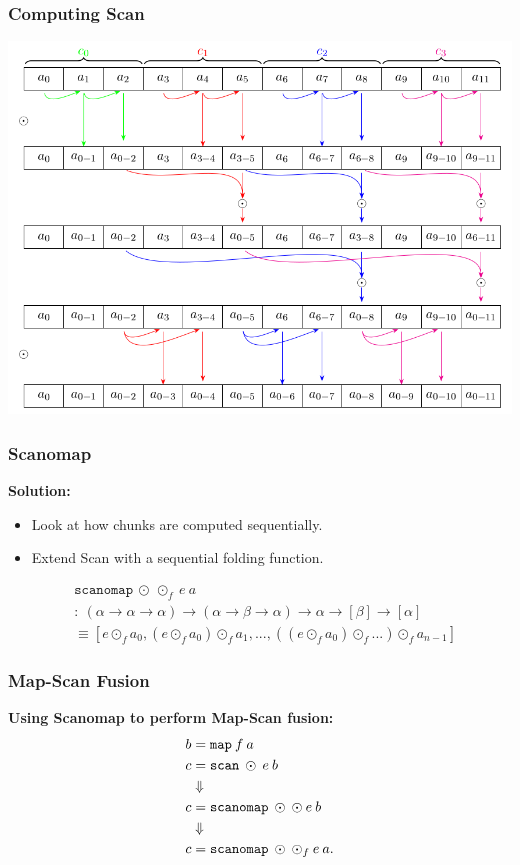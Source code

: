 \documentclass{beamer}
\begin{document}
\begin{frame}

 \frametitle{Computing Scan}
 \includegraphics[height=0.7\textheight]{image/monster.png}
\end{frame}


\begin{frame}

 \frametitle{Scanomap}
\large \textbf{Solution:}
 \begin{itemize}
 \item Look at how chunks are computed sequentially.
 \item Extend Scan with a sequential folding function.
 \end{itemize}
 \begin{align*}
   &\mathtt{scanomap} \: \odot \: \odot_f \: e \: a \: \\ &: \:(\alpha \to \alpha \to \alpha) \to (\alpha \to \beta \to \alpha)
 \to \alpha \to [\beta] \to [\alpha] \\
&\equiv
 [e \odot_f a_0, (e \odot_f a_0) \odot_f a_1, ..., ((e \odot_f a_0) \odot_f ...) \odot_f a_{n-1}]
 \end{align*}
\end{frame}


\begin{frame}

 \frametitle{Map-Scan Fusion}
\large \textbf{Using Scanomap to perform Map-Scan fusion:}
\begin{align*}
  b &= \mathtt{map} \: f \: a \\
  c &= \mathtt{scan} \: \odot \: e \: b \\
&\Downarrow \\
  c &= \mathtt{scanomap} \: \odot \: \odot \: e \: b \\
&\Downarrow \\
  c &= \mathtt{scanomap} \: \odot \: \odot_f \: e \: a\mathnormal{.}
\end{align*}
\end{frame}
\end{document}
